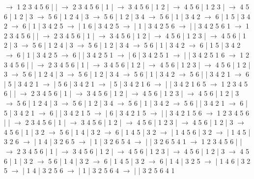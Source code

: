 \documentclass{article}
\begin{document}
\newline
 $\rightarrow$ 1 2 3 4 5 6 |  |  $\rightarrow$ 2 3 4 5 6 | 1 |  $\rightarrow$ 3 4 5 6 | 1 2 |  $\rightarrow$ 4 5 6 | 1 2 3 |  $\rightarrow$ 4 5 6 | 1 2 | 3 $\rightarrow$ 5 6 | 1 2 4 | 3 $\rightarrow$ 5 6 | 1 2 | 3 4 $\rightarrow$ 5 6 | 1 | 3 4 2 $\rightarrow$ 6 | 1 5 | 3 4 2 $\rightarrow$ 6 | 1 | 3 4 2 5 $\rightarrow$  | 1 6 | 3 4 2 5 $\rightarrow$  | 1 | 3 4 2 5 6 $\rightarrow$  |  | 3 4 2 5 6 1
\newline
 $\rightarrow$ 1 2 3 4 5 6 |  |  $\rightarrow$ 2 3 4 5 6 | 1 |  $\rightarrow$ 3 4 5 6 | 1 2 |  $\rightarrow$ 4 5 6 | 1 2 3 |  $\rightarrow$ 4 5 6 | 1 2 | 3 $\rightarrow$ 5 6 | 1 2 4 | 3 $\rightarrow$ 5 6 | 1 2 | 3 4 $\rightarrow$ 5 6 | 1 | 3 4 2 $\rightarrow$ 6 | 1 5 | 3 4 2 $\rightarrow$ 6 | 1 | 3 4 2 5 $\rightarrow$ 6 |  | 3 4 2 5 1 $\rightarrow$  | 6 | 3 4 2 5 1 $\rightarrow$  |  | 3 4 2 5 1 6
\newline
 $\rightarrow$ 1 2 3 4 5 6 |  |  $\rightarrow$ 2 3 4 5 6 | 1 |  $\rightarrow$ 3 4 5 6 | 1 2 |  $\rightarrow$ 4 5 6 | 1 2 3 |  $\rightarrow$ 4 5 6 | 1 2 | 3 $\rightarrow$ 5 6 | 1 2 4 | 3 $\rightarrow$ 5 6 | 1 2 | 3 4 $\rightarrow$ 5 6 | 1 | 3 4 2 $\rightarrow$ 5 6 |  | 3 4 2 1 $\rightarrow$ 6 | 5 | 3 4 2 1 $\rightarrow$  | 5 6 | 3 4 2 1 $\rightarrow$  | 5 | 3 4 2 1 6 $\rightarrow$  |  | 3 4 2 1 6 5
\newline
 $\rightarrow$ 1 2 3 4 5 6 |  |  $\rightarrow$ 2 3 4 5 6 | 1 |  $\rightarrow$ 3 4 5 6 | 1 2 |  $\rightarrow$ 4 5 6 | 1 2 3 |  $\rightarrow$ 4 5 6 | 1 2 | 3 $\rightarrow$ 5 6 | 1 2 4 | 3 $\rightarrow$ 5 6 | 1 2 | 3 4 $\rightarrow$ 5 6 | 1 | 3 4 2 $\rightarrow$ 5 6 |  | 3 4 2 1 $\rightarrow$ 6 | 5 | 3 4 2 1 $\rightarrow$ 6 |  | 3 4 2 1 5 $\rightarrow$  | 6 | 3 4 2 1 5 $\rightarrow$  |  | 3 4 2 1 5 6
\newline
 $\rightarrow$ 1 2 3 4 5 6 |  |  $\rightarrow$ 2 3 4 5 6 | 1 |  $\rightarrow$ 3 4 5 6 | 1 2 |  $\rightarrow$ 4 5 6 | 1 2 3 |  $\rightarrow$ 4 5 6 | 1 2 | 3 $\rightarrow$ 4 5 6 | 1 | 3 2 $\rightarrow$ 5 6 | 1 4 | 3 2 $\rightarrow$ 6 | 1 4 5 | 3 2 $\rightarrow$  | 1 4 5 6 | 3 2 $\rightarrow$  | 1 4 5 | 3 2 6 $\rightarrow$  | 1 4 | 3 2 6 5 $\rightarrow$  | 1 | 3 2 6 5 4 $\rightarrow$  |  | 3 2 6 5 4 1
\newline
 $\rightarrow$ 1 2 3 4 5 6 |  |  $\rightarrow$ 2 3 4 5 6 | 1 |  $\rightarrow$ 3 4 5 6 | 1 2 |  $\rightarrow$ 4 5 6 | 1 2 3 |  $\rightarrow$ 4 5 6 | 1 2 | 3 $\rightarrow$ 4 5 6 | 1 | 3 2 $\rightarrow$ 5 6 | 1 4 | 3 2 $\rightarrow$ 6 | 1 4 5 | 3 2 $\rightarrow$ 6 | 1 4 | 3 2 5 $\rightarrow$  | 1 4 6 | 3 2 5 $\rightarrow$  | 1 4 | 3 2 5 6 $\rightarrow$  | 1 | 3 2 5 6 4 $\rightarrow$  |  | 3 2 5 6 4 1
\end{document}
